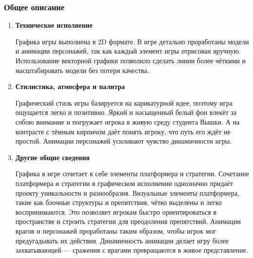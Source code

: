 \subsubsection{Общее описание}
    \begin{enumerate}
    \item \textbf{Техническое исполнение} \par
    Графика игры выполнена в 2D формате. В игре детально проработаны модели и анимации персонажей, так как каждый элемент игры отрисован вручную. Использование векторной графики позволило сделать линии более чёткими и масштабировать модели без потери качества.
    \item\textbf{Стилистика, атмосфера и палитра} \par
    Графический стиль игры базируется на карикатурной идее, поэтому игра ощущается легко и позитивно. Яркий и насыщенный белый фон влекёт за собою внимание и погружает игрока в живую среду студента Вышки. А на контрасте с тёмным кирпичом даёт понять игроку, что путь его ждёт не простой. Анимации персонажей усиливают чувство динамичности игры.
    \item \textbf{Другие общие сведения} \par
    Графика в игре сочетает в себе элементы платформера и стратегии. Сочетание платформера и стратегии в графическом исполнении однозначно придаёт проекту уникальности и разнообразия. Визуальные элементы платформера, такие как блочные структуры и препятствия, чётко выделены и легко воспринимаются. Это позволяет игрокам быстро ориентироваться в пространстве и строить стратегии для преодоления препятствий. Анимации врагов и персонажей проработаны таким образом, чтобы игрок мог предугадывать их действия. Динамичность анимации делает игру более захватывающей — сражения с врагами превращаются в живое представление.
    \end{enumerate}